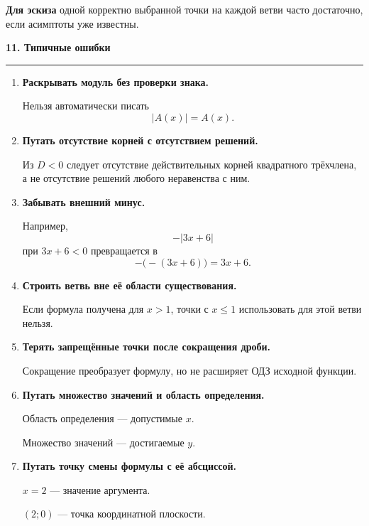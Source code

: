 \documentclass[a4paper,12pt]{article}
\newcommand{\lessonsection}[1]{%
    \vspace{0.6em}
    {\Large\bfseries\color{darkaccent}#1}\par
    \vspace{0.15em}
    {\color{softgray}\rule{\linewidth}{0.8pt}}
    \vspace{0.3em}
}
\begin{document}
\textbf{Для эскиза} одной корректно выбранной точки на каждой ветви
часто достаточно, если асимптоты уже известны.


\lessonsection{11. Типичные ошибки}

\begin{enumerate}
    \item \textbf{Раскрывать модуль без проверки знака.}

    Нельзя автоматически писать
    \[
    |A(x)|=A(x).
    \]

    \item \textbf{Путать отсутствие корней с отсутствием решений.}

    Из \(D<0\) следует отсутствие действительных корней квадратного
    трёхчлена, а не отсутствие решений любого неравенства с ним.

    \item \textbf{Забывать внешний минус.}

    Например,
    \[
    -|3x+6|
    \]
    при \(3x+6<0\) превращается в
    \[
    -\bigl(-(3x+6)\bigr)=3x+6.
    \]

    \item \textbf{Строить ветвь вне её области существования.}

    Если формула получена для \(x>1\), точки с \(x\le1\)
    использовать для этой ветви нельзя.

    \item \textbf{Терять запрещённые точки после сокращения дроби.}

    Сокращение преобразует формулу, но не расширяет ОДЗ исходной функции.

    \item \textbf{Путать множество значений и область определения.}

    Область определения --- допустимые \(x\).

    Множество значений --- достигаемые \(y\).

    \item \textbf{Путать точку смены формулы с её абсциссой.}

    \(x=2\) --- значение аргумента.

    \((2;0)\) --- точка координатной плоскости.
\end{enumerate}

\clearpage
\end{document}
